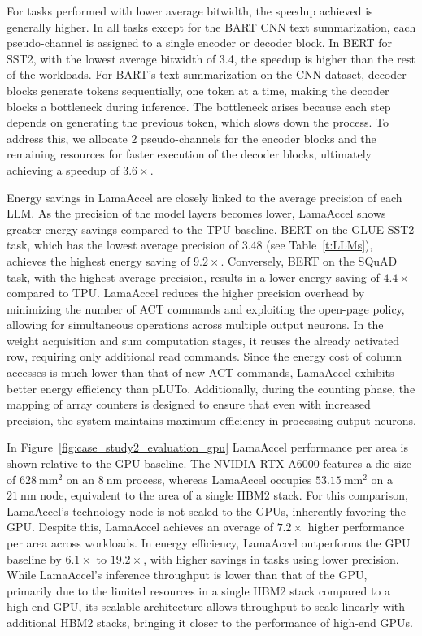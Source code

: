 For tasks performed with lower average bitwidth, the speedup achieved is generally higher. In all tasks except for the BART CNN text summarization, each pseudo-channel is assigned to a single encoder or decoder block. In BERT for SST2, with the lowest average bitwidth of 3.4, the speedup is higher than the rest of the workloads. For BART's text summarization on the CNN dataset, decoder blocks generate tokens sequentially, one token at a time, making the decoder blocks a bottleneck during inference. The bottleneck arises because each step depends on generating the previous token, which slows down the process. To address this, we allocate 2 pseudo-channels for the encoder blocks and the remaining resources for faster execution of the decoder blocks, ultimately achieving a speedup of $3.6\times$.

Energy savings in LamaAccel are closely linked to the average precision of each LLM. As the precision of the model layers becomes lower, LamaAccel shows greater energy savings compared to the TPU baseline. BERT on the GLUE-SST2 task, which has the lowest average precision of 3.48 (see Table~\ref{t:LLMs}), achieves the highest energy saving of $9.2\times$. Conversely, BERT on the SQuAD task, with the highest average precision, results in a lower energy saving of $4.4\times$ compared to TPU. LamaAccel reduces the higher precision overhead by minimizing the number of ACT commands and exploiting the open-page policy, allowing for simultaneous operations across multiple output neurons. In the weight acquisition and sum computation stages, it reuses the already activated row, requiring only additional read commands. Since the energy cost of column accesses is much lower than that of new ACT commands, LamaAccel exhibits better energy efficiency than pLUTo. Additionally, during the counting phase, the mapping of array counters is designed to ensure that even with increased precision, the system maintains maximum efficiency in processing output neurons.

In Figure~\ref{fig:case_study2_evaluation_gpu} LamaAccel performance per area is shown relative to the GPU baseline. The NVIDIA RTX A6000 features a die size of $628 \ \text{mm}^2$ on an $8 \ \text{nm}$ process, whereas LamaAccel occupies $53.15 \ \text{mm}^2$ on a $21 \ \text{nm}$ node, equivalent to the area of a single HBM2 stack. For this comparison, LamaAccel's technology node is not scaled to the GPUs, inherently favoring the GPU. Despite this, LamaAccel achieves an average of $7.2\times$ higher performance per area across workloads. In energy efficiency, LamaAccel outperforms the GPU baseline by $6.1\times$ to $19.2\times$, with higher savings in tasks using lower precision. While LamaAccel's inference throughput is lower than that of the GPU, primarily due to the limited resources in a single HBM2 stack compared to a high-end GPU, its scalable architecture allows throughput to scale linearly with additional HBM2 stacks, bringing it closer to the performance of high-end GPUs.

